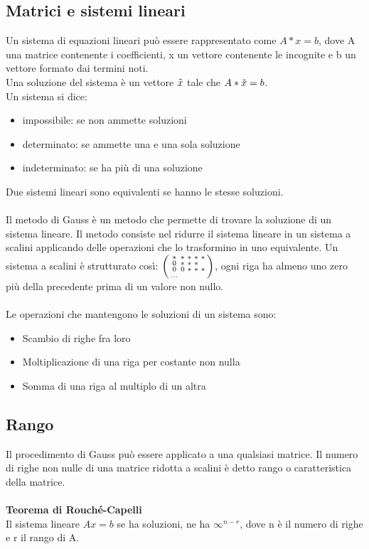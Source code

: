 \documentclass{article}
\newcommand{\smat}{psmallmatrix}
\begin{document}
\subsection{Matrici e sistemi lineari}
Un sistema di equazioni lineari può essere rappresentato come $A*x=b$, dove A  una matrice contenente i coefficienti, x un vettore contenente le incognite e b un vettore formato dai termini noti.\\
Una soluzione del sistema è un vettore $\Tilde{x}$ tale che $A*\Tilde{x}=b$.\\
Un sistema si dice:
\begin{itemize}
    \item impossibile: se non ammette soluzioni
    \item determinato: se ammette una e una sola soluzione
    \item indeterminato: se ha più di una soluzione
\end{itemize}
Due sistemi lineari sono equivalenti se hanno le stesse soluzioni.\\\\
Il metodo di Gauss è un metodo che permette di trovare la soluzione di un sistema lineare. Il metodo consiste nel ridurre il sistema lineare in un sistema a scalini applicando delle operazioni che lo trasformino in uno equivalente. Un sistema a scalini è strutturato così: $\begin{\smat} *&*&*&*&*\\0&*&*&*\\0&0&*&*&*\\... \end{\smat}$, ogni riga ha almeno uno zero più della precedente prima di un valore non nullo.\\\\
Le operazioni che mantengono le soluzioni di un sistema sono:
\begin{itemize}
    \item Scambio di righe fra loro
    \item Moltiplicazione di una riga per costante non nulla
    \item Somma di una riga al multiplo di un altra
\end{itemize}

\subsection{Rango}
Il procedimento di Gauss può essere applicato a una qualsiasi matrice. Il numero di righe non nulle di una matrice ridotta a scalini è detto rango o caratteristica della matrice.\\\\
\textbf{Teorema di Rouché-Capelli}\\
Il sistema lineare $Ax=b$ se ha soluzioni, ne ha $\infty^{n-r}$, dove n è il numero di righe e r il rango di A.
\end{document}
